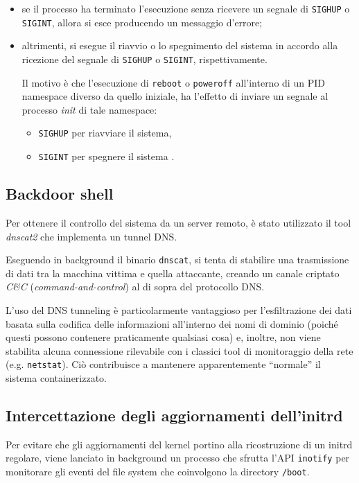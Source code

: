 \documentclass{article}
\begin{document}
\begin{itemize}
	\item se il processo ha terminato l'esecuzione senza ricevere un segnale di \texttt{SIGHUP} o \texttt{SIGINT}, allora si esce producendo un messaggio d'errore;
	\item altrimenti, si esegue il riavvio o lo spegnimento del sistema in accordo alla ricezione del segnale di \texttt{SIGHUP} o \texttt{SIGINT}, rispettivamente.
	
	Il motivo è che l'esecuzione di \texttt{reboot} o \texttt{poweroff} all'interno di un PID namespace diverso da quello iniziale, ha l'effetto di inviare un segnale al processo \textsl{init} di tale namespace:
	\begin{itemize}
		\item \texttt{SIGHUP} per riavviare il sistema,
		\item \texttt{SIGINT} per spegnere il sistema \cite{man reboot}.
	\end{itemize}
\end{itemize}

\subsection{Backdoor shell}
Per ottenere il controllo del sistema da un server remoto, è stato utilizzato il tool \textsl{dnscat2} \cite{dnscat2} che implementa un tunnel DNS.

Eseguendo in background il binario \texttt{dnscat}, si tenta di stabilire una trasmissione di dati tra la macchina vittima e quella attaccante, creando un canale criptato \textsl{C\&C} (\textsl{command-and-control}) al di sopra del protocollo DNS.

L'uso del DNS tunneling è particolarmente vantaggioso per l'esfiltrazione dei dati basata sulla codifica delle informazioni all'interno dei nomi di dominio (poiché questi possono contenere praticamente qualsiasi cosa) e, inoltre, non viene stabilita alcuna connessione rilevabile con i classici tool di monitoraggio della rete (e.g. \texttt{netstat}). Ciò contribuisce a mantenere apparentemente ``normale'' il sistema containerizzato.

\subsection{Intercettazione degli aggiornamenti dell'initrd}
Per evitare che gli aggiornamenti del kernel portino alla ricostruzione di un initrd regolare, viene lanciato in background un processo che sfrutta l'API \texttt{inotify} per monitorare gli eventi del file system che coinvolgono la directory \texttt{/boot}.
\end{document}
